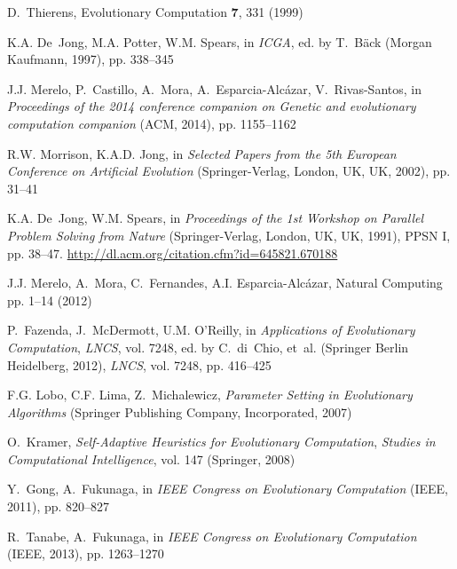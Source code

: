 \begin{thebibliography}{10}
D.~Thierens, Evolutionary Computation \textbf{7}, 331 (1999)

K.A. De~Jong, M.A. Potter, W.M. Spears, in \emph{ICGA}, ed. by T.~B\"ack
  (Morgan Kaufmann, 1997), pp. 338--345

J.J. Merelo, P.~Castillo, A.~Mora, A.~Esparcia-Alc{\'a}zar, V.~Rivas-Santos, in
  \emph{Proceedings of the 2014 conference companion on Genetic and
  evolutionary computation companion} (ACM, 2014), pp. 1155--1162

R.W. Morrison, K.A.D. Jong, in \emph{Selected Papers from the 5th European
  Conference on Artificial Evolution} (Springer-Verlag, London, UK, UK, 2002),
  pp. 31--41

K.A. De~Jong, W.M. Spears, in \emph{Proceedings of the 1st Workshop on Parallel
  Problem Solving from Nature} (Springer-Verlag, London, UK, UK, 1991), PPSN I,
  pp. 38--47.
\newblock \urlprefix\url{http://dl.acm.org/citation.cfm?id=645821.670188}

J.J. Merelo, A.~Mora, C.~Fernandes, A.I. Esparcia-Alc{\'a}zar, Natural
  Computing pp. 1--14 (2012)

P.~Fazenda, J.~McDermott, U.M. O'Reilly, in \emph{Applications of Evolutionary
  Computation}, \emph{LNCS}, vol. 7248, ed. by C.~di~Chio, et~al. (Springer
  Berlin Heidelberg, 2012), \emph{LNCS}, vol. 7248, pp. 416--425

F.G. Lobo, C.F. Lima, Z.~Michalewicz, \emph{Parameter Setting in Evolutionary
  Algorithms} (Springer Publishing Company, Incorporated, 2007)

O.~Kramer, \emph{Self-Adaptive Heuristics for Evolutionary Computation},
  \emph{Studies in Computational Intelligence}, vol. 147 (Springer, 2008)

Y.~Gong, A.~Fukunaga, in \emph{IEEE Congress on Evolutionary Computation}
  (IEEE, 2011), pp. 820--827

R.~Tanabe, A.~Fukunaga, in \emph{IEEE Congress on Evolutionary Computation}
  (IEEE, 2013), pp. 1263--1270

\end{thebibliography}








